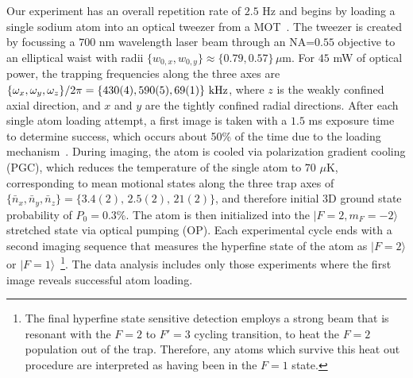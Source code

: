 \documentclass[aps,prl,twocolumn,groupedaddress]{revtex4-1}
\begin{document}
Our experiment has an overall repetition rate of $2.5$ Hz and
begins by loading a single sodium atom into an optical tweezer from a MOT~\cite{Hutzler2017-LightShifts}.
The tweezer is created by focussing a $700$ nm wavelength laser beam through an NA=$0.55$ objective to an elliptical waist with radii $\{w_{0,x},w_{0,y}\}\approx \{0.79,0.57\}\,\mu$m.
For $45$ mW of optical power, the trapping frequencies along the three axes are
$\{\omega_x,\omega_y,\omega_z\}/2\pi = \{430(4), 590(5), 69(1)\}\ \text{\text{kHz}}$,
where $z$ is the weakly confined axial direction,
and $x$ and $y$ are the tightly confined radial directions.
After each single atom loading attempt, a first image is taken with a $1.5$ ms exposure time
to determine success, which occurs about 50\% of the time due to the loading mechanism~\cite{Schlosser2001}.
During imaging, the atom is cooled via polarization gradient cooling (PGC),
which reduces the temperature of the single atom to $70$ $\mu$K,
corresponding to mean motional states along the three trap axes of
$\{\bar n_x, \bar n_y, \bar n_z\}=\{3.4(2),\, 2.5(2),\, 21(2)\}$, and therefore initial 3D ground state probability of $P_0=0.3$\%.
The atom is then initialized into
the $|F=2, m_F=-2\rangle$ stretched state via optical pumping (OP).
Each experimental cycle ends with a second imaging sequence that measures the hyperfine state of the atom as $|F=2\rangle$ or $|F=1\rangle$~\footnote{The final hyperfine state sensitive detection employs a strong beam that is resonant with the $F=2$ to $F'=3$ cycling transition, to heat the $F=2$ population out of the trap. Therefore, any atoms which survive this heat out procedure are interpreted as having been in the $F=1$ state.}. The data analysis includes only those experiments where the first image reveals successful atom loading.

\end{document}
